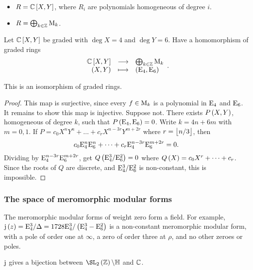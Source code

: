 \begin{example*}
\hfill
\begin{itemize}
\item $ R = \CC\sbr{X, Y} $, where $ R_i $ are polynomials homogeneous of degree $ i $.
\item $ R = \bigoplus_{k \in \mathbb{Z}} \mathrm{M}_k $.
\end{itemize}
\end{example*}

\pagebreak

Let $ \CC\sbr{X, Y} $ be graded with $ \deg X = 4 $ and $ \deg Y = 6 $. Have a homomorphism of graded rings
$$ \function{\CC\sbr{X, Y}}{\bigoplus_{k \in \ZZ} \M_k}{\br{X, Y}}{\br{\E_4, \E_6}}. $$

\begin{theorem}
This is an isomorphism of graded rings.
\end{theorem}

\begin{proof}
This map is surjective, since every $ f \in \mathrm{M}_k $ is a polynomial in $ \mathrm{E}_4 $ and $ \mathrm{E}_6 $. It remains to show this map is injective. Suppose not. There exists $ P\br{X, Y} $, homogeneous of degree $ k $, such that $ P\br{\E_4, \E_6} = 0 $. Write $ k = 4n + 6m $ with $ m = 0, 1 $. If $ P = c_0X^nY^n + \dots + c_rX^{n - 3r}Y^{m + 2r} $ where $ r = \left\lfloor n / 3 \right\rfloor $, then
$$ c_0\mathrm{E}_4^n\mathrm{E}_6^n + \dots + c_r\mathrm{E}_4^{n - 3r}\mathrm{E}_6^{m + 2r} = 0. $$
Dividing by $ \mathrm{E}_4^{n - 3r}\mathrm{E}_6^{m + 2r} $, get $ Q\br{\E_4^3 / \E_6^2} = 0 $ where $ Q\br{X} = c_0X^r + \dots + c_r $. Since the roots of $ Q $ are discrete, and $ \mathrm{E}_4^3 / \mathrm{E}_6^2 $ is non-constant, this is impossible.
\end{proof}

\subsubsection{The space of meromorphic modular forms}

\begin{note*}
The meromorphic modular forms of weight zero form a field. For example, $ \j\br{z} = \E_4^3 / \Delta = 1728\E_4^3 / \br{\E_4^3 - \E_6^2} $ is a non-constant meromorphic modular form, with a pole of order one at $ \infty $, a zero of order three at $ \rho $, and no other zeroes or poles.
\end{note*}

\begin{theorem}
$ \mathrm{j} $ gives a bijection between $ \SL_2\br{\ZZ} \backslash \HH $ and $ \mathbb{C} $.
\end{theorem}

